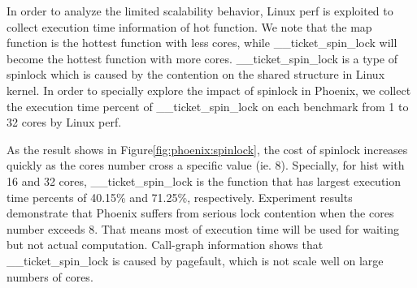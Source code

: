In order to analyze the limited scalability behavior, Linux perf is exploited to collect execution time information of hot function. 
We note that the map function is the hottest function with less cores, while \_\_ticket\_spin\_lock will become the hottest function with more cores.
\_\_ticket\_spin\_lock is a type of spinlock which is caused by the contention on the shared structure in Linux kernel.
In order to specially explore the impact of spinlock in Phoenix, we collect the execution time percent of \_\_ticket\_spin\_lock on each benchmark from 1 to 32 cores by Linux perf.

As the result shows in Figure\ref{fig:phoenix:spinlock}, the cost of spinlock increases quickly as the cores number cross a specific value (ie. 8).
Specially, for hist with 16 and 32 cores, \_\_ticket\_spin\_lock is the function that has largest execution time percents of 40.15\%  and 71.25\%, respectively. 
Experiment results demonstrate that Phoenix suffers from serious lock contention when the cores number exceeds 8. 
That means most of execution time will be used for waiting but not actual computation.
Call-graph information shows that \_\_ticket\_spin\_lock is caused by pagefault, which is not scale well on large numbers of cores.

